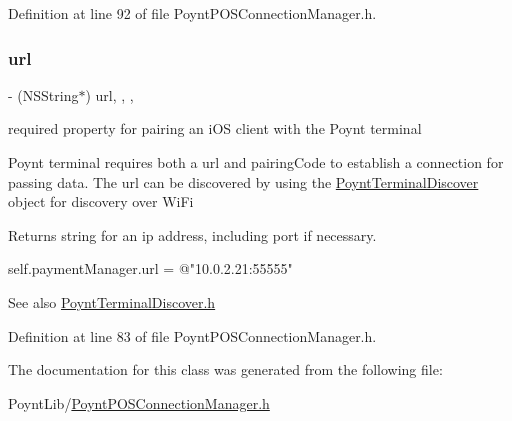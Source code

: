 Definition at line 92 of file Poynt\+P\+O\+S\+Connection\+Manager.\+h.

\hypertarget{interface_poynt_p_o_s_connection_manager_a43481294fa1d2f0ebe7cff14b17726cc}{}\label{interface_poynt_p_o_s_connection_manager_a43481294fa1d2f0ebe7cff14b17726cc} 
\subsubsection{\texorpdfstring{url}{url}}
{\footnotesize\ttfamily -\/ (N\+S\+String$\ast$) url\hspace{0.3cm}{\ttfamily [read]}, {\ttfamily [write]}, {\ttfamily [nonatomic]}, {\ttfamily [strong]}}



required property for pairing an i\+OS client with the Poynt terminal 

Poynt terminal requires both a url and pairing\+Code to establish a connection for passing data. The url can be discovered by using the \hyperlink{interface_poynt_terminal_discover}{Poynt\+Terminal\+Discover} object for discovery over Wi\+Fi

\begin{DoxyReturn}{Returns}
string for an ip address, including port if necessary.
\end{DoxyReturn}

\begin{DoxyCode}
\textcolor{keyword}{self}.paymentManager.url = \textcolor{stringliteral}{@"10.0.2.21:55555"}
\end{DoxyCode}


\begin{DoxySeeAlso}{See also}
\hyperlink{_poynt_terminal_discover_8h}{Poynt\+Terminal\+Discover.\+h} 
\end{DoxySeeAlso}


Definition at line 83 of file Poynt\+P\+O\+S\+Connection\+Manager.\+h.



The documentation for this class was generated from the following file\+:\begin{DoxyCompactItemize}
\item 
Poynt\+Lib/\hyperlink{_poynt_p_o_s_connection_manager_8h}{Poynt\+P\+O\+S\+Connection\+Manager.\+h}\end{DoxyCompactItemize}
